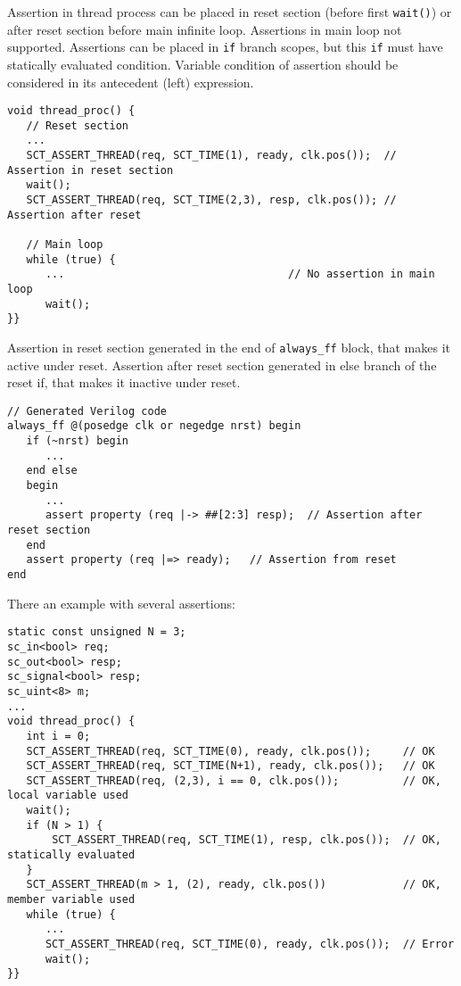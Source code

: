 Assertion in thread process can be placed in reset section (before first {\tt wait()}) or after reset section before main infinite loop. Assertions in main loop not supported. Assertions can be placed in {\tt if} branch scopes, but this {\tt if} must have statically evaluated condition. Variable condition of assertion should be considered in its antecedent (left) expression. 

\begin{lstlisting}[style=mycpp]
void thread_proc() {
   // Reset section
   ...
   SCT_ASSERT_THREAD(req, SCT_TIME(1), ready, clk.pos());  // Assertion in reset section
   wait();                        
   SCT_ASSERT_THREAD(req, SCT_TIME(2,3), resp, clk.pos()); // Assertion after reset

   // Main loop 
   while (true) { 
      ...                                   // No assertion in main loop 
      wait();
}}
\end{lstlisting}

Assertion in reset section generated in the end of {\tt always\_ff} block, that makes it active under reset. Assertion after reset section generated in else branch of the reset if, that makes it inactive under reset.

\begin{lstlisting}[style=myverilog]
// Generated Verilog code
always_ff @(posedge clk or negedge nrst) begin
   if (~nrst) begin
      ...
   end else 
   begin 
      ... 
      assert property (req |-> ##[2:3] resp);  // Assertion after reset section 
   end 
   assert property (req |=> ready);   // Assertion from reset  
end
\end{lstlisting}

There an example with several assertions:

\begin{lstlisting}[style=mycpp]
static const unsigned N = 3;
sc_in<bool> req;
sc_out<bool> resp;
sc_signal<bool> resp;
sc_uint<8> m;
...
void thread_proc() {
   int i = 0;
   SCT_ASSERT_THREAD(req, SCT_TIME(0), ready, clk.pos());     // OK
   SCT_ASSERT_THREAD(req, SCT_TIME(N+1), ready, clk.pos());   // OK 
   SCT_ASSERT_THREAD(req, (2,3), i == 0, clk.pos());          // OK, local variable used
   wait();
   if (N > 1) {
       SCT_ASSERT_THREAD(req, SCT_TIME(1), resp, clk.pos());  // OK, statically evaluated
   }
   SCT_ASSERT_THREAD(m > 1, (2), ready, clk.pos())            // OK, member variable used
   while (true) {   
      ...
      SCT_ASSERT_THREAD(req, SCT_TIME(0), ready, clk.pos());  // Error
      wait();
}}
\end{lstlisting}

